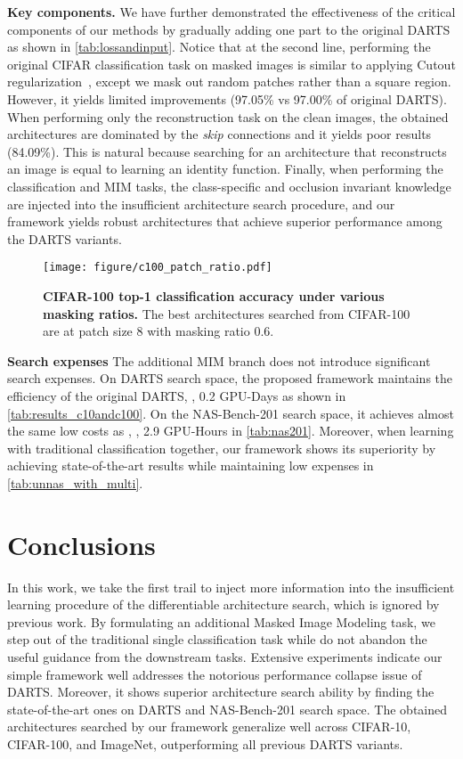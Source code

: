 \documentclass[10pt,twocolumn,letterpaper]{article}
\newcommand{\mypara}[1]{\vspace{1mm}\noindent\textbf{#1}}
\begin{document}
\mypara{Key components.}
We have further demonstrated the effectiveness of the critical components of our methods by gradually adding one part to the original DARTS as shown in \cref{tab:lossandinput}.
Notice that at the second line, performing the original CIFAR classification task on masked images is similar to applying Cutout regularization~\cite{Devries_2018_cutout}, except we mask out random patches rather than a square region.
However, it yields limited improvements (97.05\% vs 97.00\% of original DARTS).
When performing only the reconstruction task on the clean images, the obtained architectures are dominated by the \textit{skip} connections and it yields poor results (84.09\%).
This is natural because searching for an architecture that reconstructs an image is equal to learning an identity function.
Finally, when performing the classification and MIM tasks, the class-specific and occlusion invariant knowledge are injected into the insufficient architecture search procedure,
and our framework yields robust architectures that achieve superior performance among the DARTS variants.
\begin{figure}[t]
  \centering
   \texttt{[image: figure/c100\_patch\_ratio.pdf]}
    \vspace{-6pt}
   \caption{\textbf{CIFAR-100 top-1 classification accuracy under various masking ratios.}
   The best architectures searched from CIFAR-100 are at patch size 8 with masking ratio 0.6.}
   \label{fig:c100_patch_ratio}
   \vspace{-6pt}
\end{figure} 
\mypara{Search expenses}
The additional MIM branch does not introduce significant search expenses.
On DARTS search space, the proposed framework maintains the efficiency of the original DARTS, \ie, 0.2 GPU-Days as shown in \cref{tab:results_c10andc100}.
On the NAS-Bench-201 search space, it achieves almost the same low costs as \cite{ye_2022_beta}, \ie, 2.9 GPU-Hours in \cref{tab:nas201}.
Moreover, when learning with traditional classification together, our framework shows its superiority by achieving state-of-the-art results while maintaining low expenses in \cref{tab:unnas_with_multi}.
\vspace{-4pt} \section{Conclusions}
\vspace{-4pt}
In this work, we take the first trail to inject more information into the insufficient learning procedure of the differentiable architecture search,
which is ignored by previous work.
By formulating an additional Masked Image Modeling task, we step out of the traditional single classification task while do not abandon the useful guidance from the downstream tasks.
Extensive experiments indicate our simple framework well addresses the notorious performance collapse issue of DARTS.
Moreover, it shows superior architecture search ability by finding the state-of-the-art ones on DARTS and NAS-Bench-201 search space.
The obtained architectures searched by our framework generalize well across CIFAR-10, CIFAR-100, and ImageNet, outperforming all previous DARTS variants.

\newpage
{\small


} 
\appendix

\end{document}
